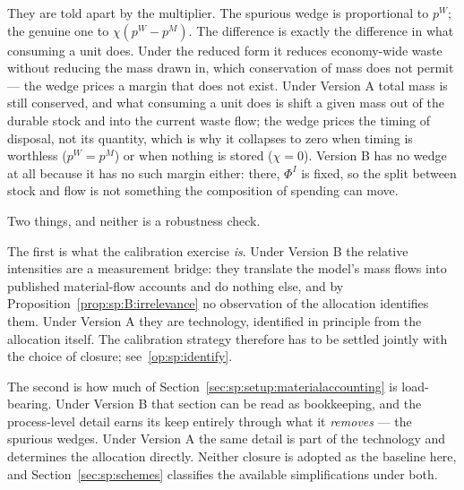 They are told apart by the multiplier. The spurious wedge is proportional to $p^W$; the genuine one to
$\chi\left(p^W-p^M\right)$. The difference is exactly the difference in what consuming a unit does. Under
the reduced form it reduces economy-wide waste without reducing the mass drawn in, which conservation of
mass does not permit --- the wedge prices a margin that does not exist. Under Version A total mass is
still conserved, and what consuming a unit does is shift a given mass out of the durable stock and into
the current waste flow; the wedge prices the timing of disposal, not its quantity, which is why it
collapses to zero when timing is worthless ($p^W=p^M$) or when nothing is stored ($\chi=0$). Version B
has no wedge at all because it has no such margin either: there, $\Phi^I$ is fixed, so the split between
stock and flow is not something the composition of spending can move.

 Two things, and neither is a robustness check.

The first is what the calibration exercise \emph{is}. Under Version B the relative intensities are a
measurement bridge: they translate the model's mass flows into published material-flow accounts and do
nothing else, and by Proposition~\ref{prop:sp:B:irrelevance} no observation of the allocation identifies
them. Under Version A they are technology, identified in principle from the allocation itself. The
calibration strategy therefore has to be settled jointly with the choice of closure; see~\ref{op:sp:identify}.

The second is how much of Section~\ref{sec:sp:setup:materialaccounting} is load-bearing. Under Version B
that section can be read as bookkeeping, and the process-level detail earns its keep entirely through
what it \emph{removes} --- the spurious wedges. Under Version A the same detail is part of the technology
and determines the allocation directly. Neither closure is adopted as the baseline here, and
Section~\ref{sec:sp:schemes} classifies the available simplifications under both.

